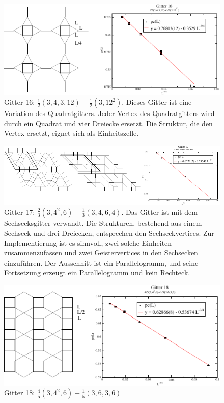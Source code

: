 \begin{figure}[p]
  \includegraphics{./Numerik-figs/2-uni-16_fig}
  \caption{Gitter 16: $\frac{1}{2}(3,4,3,12)+\frac{1}{2}(3,12^2)$. Dieses Gitter ist eine Variation des Quadratgitters. Jeder Vertex des Quadratgitters wird durch ein Quadrat und vier Dreiecke ersetzt. Die Struktur, die den Vertex ersetzt, eignet sich als Einheitszelle.}
\end{figure}
\clearpage
\begin{figure}[p]
  \includegraphics{./Numerik-figs/2-uni-17_fig}
  \caption{Gitter 17: $\frac{2}{3}(3,4^2,6)+\frac{1}{3}(3,4,6,4)$. Das Gitter ist mit dem Sechsecksgitter verwandt. Die Strukturen, bestehend aus einem Sechseck und drei Dreiecken, entsprechen den Sechseckvertices. Zur Implementierung ist es sinnvoll, zwei solche Einheiten zusammenzufassen und zwei Geistervertices in den Sechsecken einzuf\"uhren. Der Ausschnitt ist ein Parallelogramm, und seine Fortsetzung erzeugt ein Parallelogramm und kein Rechteck.}
\end{figure}
\begin{figure}[p]
  \includegraphics{./Numerik-figs/2-uni-18_fig}
  \caption{Gitter 18: $\frac{4}{5}(3,4^2,6)+\frac{1}{5}(3,6,3,6)$}
\end{figure}
